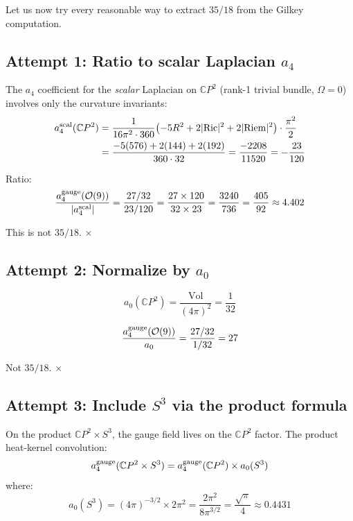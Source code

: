 \documentclass[12pt,a4paper]{article}
\theoremstyle{definition}
\begin{document}
Let us now try every reasonable way to extract $35/18$ from the
Gilkey computation.

\subsection{Attempt 1: Ratio to scalar Laplacian $a_4$}

The $a_4$ coefficient for the \emph{scalar} Laplacian on
$\mathbb{C}P^2$ (rank-1 trivial bundle, $\Omega = 0$) involves only
the curvature invariants:
\begin{align}
a_4^{\rm scal}(\mathbb{C}P^2)
&= \frac{1}{16\pi^2 \cdot 360}\bigl(-5R^2 + 2|{\rm Ric}|^2
+ 2|{\rm Riem}|^2\bigr)\cdot\frac{\pi^2}{2}
\nonumber\\
&= \frac{-5(576) + 2(144) + 2(192)}{360 \cdot 32}
= \frac{-2208}{11520} = -\frac{23}{120}
\end{align}

Ratio:
\begin{equation}
\frac{a_4^{\rm gauge}(\mathcal{O}(9))}{|a_4^{\rm scal}|}
= \frac{27/32}{23/120} = \frac{27 \times 120}{32 \times 23}
= \frac{3240}{736} = \frac{405}{92} \approx 4.402
\end{equation}

This is not $35/18$. $\times$

\subsection{Attempt 2: Normalize by $a_0$}

\begin{equation}
a_0(\mathbb{C}P^2) = \frac{\mathrm{Vol}}{(4\pi)^2} = \frac{1}{32}
\end{equation}

\begin{equation}
\frac{a_4^{\rm gauge}(\mathcal{O}(9))}{a_0}
= \frac{27/32}{1/32} = 27
\end{equation}

Not $35/18$. $\times$

\subsection{Attempt 3: Include $S^3$ via the product formula}

On the product $\mathbb{C}P^2 \times S^3$, the gauge field lives on
the $\mathbb{C}P^2$ factor.  The product heat-kernel convolution:
\begin{equation}
a_4^{\rm gauge}(\mathbb{C}P^2 \times S^3)
= a_4^{\rm gauge}(\mathbb{C}P^2) \times a_0(S^3)
\end{equation}
where:
\begin{equation}
a_0(S^3) = (4\pi)^{-3/2} \times 2\pi^2
= \frac{2\pi^2}{8\pi^{3/2}} = \frac{\sqrt{\pi}}{4}
\approx 0.4431
\end{equation}
\end{document}
